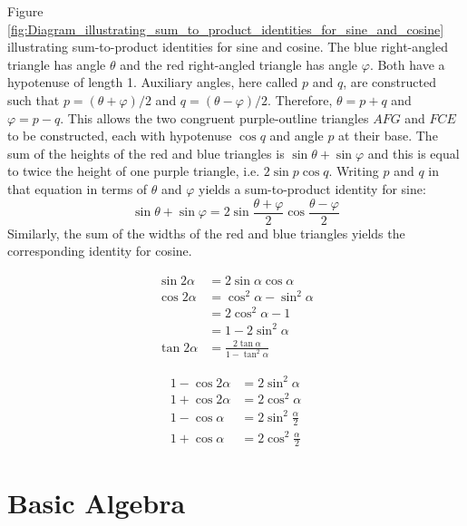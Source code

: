 Figure \ref{fig:Diagram_illustrating_sum_to_product_identities_for_sine_and_cosine} 
illustrating sum-to-product identities for sine and cosine. 
The blue right-angled triangle has angle $\theta$ and the 
red right-angled triangle has angle $\varphi$. 
Both have a hypotenuse of length 1. Auxiliary angles, here called
$p$ and $q$, are constructed such that $p = (\theta + \varphi) / 2$ 
and $q = (\theta - \varphi) / 2$. Therefore, $\theta = p + q$
and $\varphi = p - q$.
This allows the two congruent purple-outline triangles
$AFG$ and $FCE$ to be constructed, 
each with hypotenuse $\cos q$ and angle $p$ at their base.
The sum of the heights of the red and blue triangles is
$\sin \theta + \sin \varphi$  and this is equal to 
twice the height of one purple triangle, 
i.e. $2 \sin p \cos q$. Writing $p$ and $q$ in that
equation in terms of $\theta$ and $\varphi$ yields 
a sum-to-product identity for sine:
\[
    \sin \theta + \sin \varphi = 2 \sin \dfrac{\theta + \varphi}{2} \cos \dfrac{\theta - \varphi}{2}
\]
Similarly, the sum of the widths of 
the red and blue triangles yields the corresponding identity for cosine.

\begin{theorem}
    \label{thm:trig-double-angle-equations}
    \begin{align*}
        \sin 2 \alpha &= 2 \sin \alpha \cos \alpha \\
        \cos 2 \alpha &= \cos^2 \alpha - \sin^2 \alpha \\ 
                      &= 2 \cos^2 \alpha - 1 \\
                      &= 1 - 2 \sin^2 \alpha \\
        \tan 2 \alpha &= \frac{2 \tan \alpha}{1 - \tan^2 \alpha}
    \end{align*}
\end{theorem}

\begin{corollary}
    \label{co:trig-order-raising-equations}
    \begin{align*}
        1 - \cos 2\alpha &= 2 \sin^2 \alpha \\
        1 + \cos 2\alpha &= 2 \cos^2 \alpha \\
        1 - \cos  \alpha &= 2 \sin^2 \frac{\alpha}{2} \\
        1 + \cos  \alpha &= 2 \cos^2 \frac{\alpha}{2} 
    \end{align*}
\end{corollary}

\section{Basic Algebra}
\label{basic-algebra}

